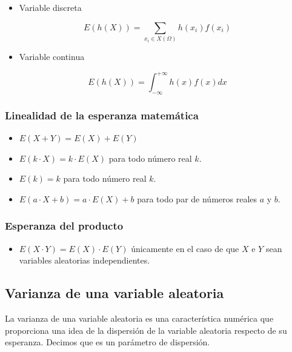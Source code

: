 \documentclass[
]{article}
\providecommand{\tightlist}{%
  \setlength{\itemsep}{0pt}\setlength{\parskip}{0pt}}
\begin{document}
\begin{itemize}
\tightlist
\item
  Variable discreta
\end{itemize}

\[
E(h(X))=\sum_{x_{i} \in X(\Omega)} h\left(x_{i}\right) f\left(x_{i}\right)
\]

\begin{itemize}
\tightlist
\item
  Variable continua
\end{itemize}

\[
E(h(X))=\int_{-\infty}^{+\infty} h(x) f(x) d x
\]

\subsubsection{Linealidad de la esperanza matemática}\label{linealidad-de-la-esperanza-matemuxe1tica}

\begin{itemize}
\item
  \(E(X+Y)=E(X)+E(Y)\)
\item
  \(E(k \cdot X)=k \cdot E(X)\) para todo número real \(k\).
\item
  \(E(k)=k\) para todo número real \(k\).
\item
  \(E(a \cdot X+b)=a \cdot E(X)+b\) para todo par de números reales \(a\) y
  \(b\).
\end{itemize}

\subsubsection{Esperanza del producto}\label{esperanza-del-producto}

\begin{itemize}
\tightlist
\item
  \(E(X \cdot Y)=E(X) \cdot E(Y)\) únicamente en el caso de que \(X\) e
  \(Y\) sean variables aleatorias independientes.
\end{itemize}

\subsection{Varianza de una variable aleatoria}\label{varianza-de-una-variable-aleatoria}

La varianza de una variable aleatoria es una característica numérica que
proporciona una idea de la dispersión de la variable aleatoria respecto
de su esperanza. Decimos que es un parámetro de dispersión.
\end{document}
